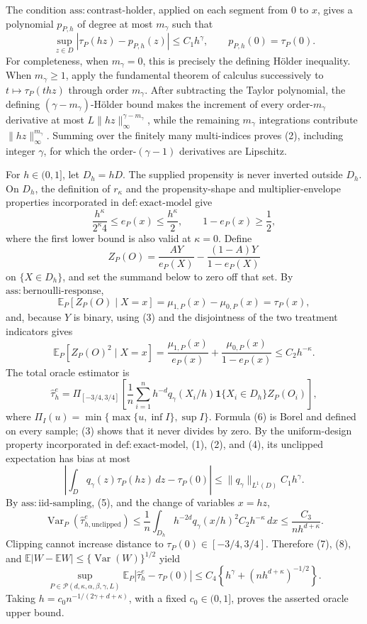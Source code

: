 The condition \(\mathrm{ass:contrast\mbox{-}holder}\), applied on each segment from \(0\) to \(x\), gives a polynomial \(p_{P,h}\) of degree at most \(m_\gamma\) such that
\[
 \sup_{z\in D}\left|\tau_P(hz)-p_{P,h}(z)\right|\leq C_1h^\gamma,
 \qquad p_{P,h}(0)=\tau_P(0).
 \tag{2}
\]
For completeness, when \(m_\gamma=0\), this is precisely the defining H\"older inequality.  When \(m_\gamma\geq1\), apply the fundamental theorem of calculus successively to \(t\mapsto\tau_P(thz)\) through order \(m_\gamma\).  After subtracting the Taylor polynomial, the defining \((\gamma-m_\gamma)\)-H\"older bound makes the increment of every order-\(m_\gamma\) derivative at most \(L\lVert hz\rVert_\infty^{\gamma-m_\gamma}\), while the remaining \(m_\gamma\) integrations contribute \(\lVert hz\rVert_\infty^{m_\gamma}\).  Summing over the finitely many multi-indices proves (2), including integer \(\gamma\), for which the order-\((\gamma-1)\) derivatives are Lipschitz.

For \(h\in(0,1]\), let \(D_h=hD\).  The supplied propensity is never inverted outside \(D_h\).  On \(D_h\), the definition of \(r_\kappa\) and the propensity-shape and multiplier-envelope properties incorporated in \(\mathrm{def:exact\mbox{-}model}\) give
\[
 \frac{h^\kappa}{2^\kappa4}\leq e_P(x)\leq\frac{h^\kappa}{2},
 \qquad 1-e_P(x)\geq\frac12,
 \tag{3}
\]
where the first lower bound is also valid at \(\kappa=0\).  Define
\[
 Z_P(O)=\frac{AY}{e_P(X)}-\frac{(1-A)Y}{1-e_P(X)}
\]
on \(\{X\in D_h\}\), and set the summand below to zero off that set.  By \(\mathrm{ass:bernoulli\mbox{-}response}\),
\[
 \mathbb E_P[Z_P(O)\mid X=x]=\mu_{1,P}(x)-\mu_{0,P}(x)=\tau_P(x),
 \tag{4}
\]
and, because \(Y\) is binary, using (3) and the disjointness of the two treatment indicators gives
\[
 \mathbb E_P[Z_P(O)^2\mid X=x]
 =\frac{\mu_{1,P}(x)}{e_P(x)}+\frac{\mu_{0,P}(x)}{1-e_P(x)}
 \leq C_2h^{-\kappa}.
 \tag{5}
\]
The total oracle estimator is
\[
 \widehat\tau^{e}_{h}
 =\Pi_{[-3/4,3/4]}\!\left[
 \frac1n\sum_{i=1}^nh^{-d}q_\gamma(X_i/h)
 \mathbf 1\{X_i\in D_h\}Z_P(O_i)
 \right],
 \tag{6}
\]
where \(\Pi_I(u)=\min\{\max\{u,\inf I\},\sup I\}\).  Formula (6) is Borel and defined on every sample; (3) shows that it never divides by zero.  By the uniform-design property incorporated in \(\mathrm{def:exact\mbox{-}model}\), (1), (2), and (4), its unclipped expectation has bias at most
\[
 \left|\int_Dq_\gamma(z)\tau_P(hz)\,dz-\tau_P(0)\right|
 \leq \lVert q_\gamma\rVert_{L^1(D)}C_1h^\gamma.
 \tag{7}
\]
By \(\mathrm{ass:iid\mbox{-}sampling}\), (5), and the change of variables \(x=hz\),
\[
 \operatorname{Var}_P(\widehat\tau^{e}_{h,\mathrm{unclipped}})
 \leq\frac1n\int_{D_h}h^{-2d}q_\gamma(x/h)^2C_2h^{-\kappa}\,dx
 \leq\frac{C_3}{nh^{d+\kappa}}.
 \tag{8}
\]
Clipping cannot increase distance to \(\tau_P(0)\in[-3/4,3/4]\).  Therefore (7), (8), and \(\mathbb E|W-\mathbb EW|\leq\{\operatorname{Var}(W)\}^{1/2}\) yield
\[
 \sup_{P\in\mathcal P(d,\kappa,\alpha,\beta,\gamma,L)}
 \mathbb E_P|\widehat\tau_h^e-\tau_P(0)|
 \leq C_4\left\{h^\gamma+(nh^{d+\kappa})^{-1/2}\right\}.
 \tag{9}
\]
Taking \(h=c_0n^{-1/(2\gamma+d+\kappa)}\), with a fixed \(c_0\in(0,1]\), proves the asserted oracle upper bound.

